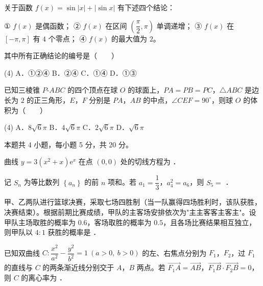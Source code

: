 \begin{question}
关于函数 $f(x)=\sin|x|+|\sin x|$ 有下述四个结论：

  ① $f(x)$ 是偶函数；
  ② $f(x)$ 在区间 $\left(\dfrac\pi2,\pi\right)$ 单调递增；
  ③ $f(x)$ 在 $[-\pi,\pi]$ 有 $4$ 个零点；
  ④ $f(x)$ 的最大值为 $2$。

其中所有正确结论的编号是\mbox{（　　）}

\begin{gkopts}(4)
\task A．①②④
\task B．②④
\task C．①④
\task D．①③
\end{gkopts}

\end{question}
\begin{question}
已知三棱锥 $P\text{-}ABC$ 的四个顶点在球 $O$ 的球面上，$PA=PB=PC$，$\triangle ABC$ 是边长为 $2$ 的正三角形，$E$，$F$ 分别是 $PA$，$AB$ 的中点，$\angle CEF=90^\circ$，则球 $O$ 的体积为\mbox{（　　）}

\begin{gkopts}(4)
\task A．$8\sqrt6\pi$
\task B．$4\sqrt6\pi$
\task C．$2\sqrt6\pi$
\task D．$\sqrt6\pi$
\end{gkopts}

\par\medskip

\end{question}

\begin{gktip}
本题共 4 小题，每小题 5 分，共 20 分。
\end{gktip}

\begin{question}
曲线 $y=3\left(x^{2}+x\right)\mathrm e^{x}$ 在点 $(0,0)$ 处的切线方程为 \gkblank{}．

\end{question}
\begin{question}
记 $S_n$ 为等比数列 $\left\{a_n\right\}$ 的前 $n$ 项和。若 $a_1=\dfrac13$，$a_4^{2}=a_6$，则 $S_5=$ \gkblank{}．

\end{question}
\begin{question}
甲、乙两队进行篮球决赛，采取七场四胜制（当一队赢得四场胜利时，该队获胜，决赛结束）。根据前期比赛成绩，甲队的主客场安排依次为"主主客客主客主"。设甲队主场取胜的概率为 $0.6$，客场取胜的概率为 $0.5$，且各场比赛结果相互独立，则甲队以 $4:1$ 获胜的概率是 \gkblank{}．

\end{question}
\begin{question}
已知双曲线 $C:\dfrac{x^{2}}{a^{2}}-\dfrac{y^{2}}{b^{2}}=1\ (a>0,\ b>0)$ 的左、右焦点分别为 $F_1$，$F_2$，过 $F_1$ 的直线与 $C$ 的两条渐近线分别交于 $A$，$B$ 两点。若 $\overrightarrow{F_1A}=\overrightarrow{AB}$，$\overrightarrow{F_1B}\cdot\overrightarrow{F_2B}=0$，则 $C$ 的离心率为 \gkblank{}．

\par\medskip

\end{question}


